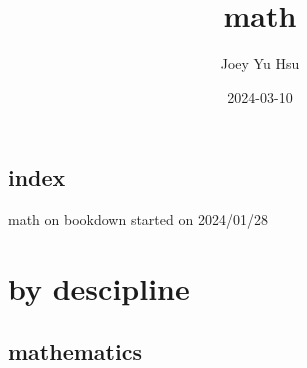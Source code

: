 \documentclass[
]{book}
\title{math}
\author{Joey Yu Hsu}
\date{2024-03-10}
\theoremstyle{definition}
\theoremstyle{definition}
\theoremstyle{definition}
\theoremstyle{definition}
\theoremstyle{remark}
\begin{document}
\maketitle

{
\hypersetup{linkcolor=}
\setcounter{tocdepth}{3}
\tableofcontents
}
\hypertarget{index}{%
\chapter*{index}\label{index}}

math on bookdown started on 2024/01/28

\hypertarget{part-by-descipline}{%
\part{by descipline}\label{part-by-descipline}}

\hypertarget{mathematics}{%
\chapter{mathematics}\label{mathematics}}
\end{document}

